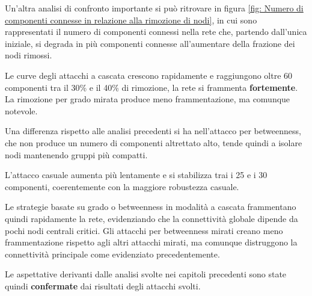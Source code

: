 Un'altra analisi di confronto importante si può ritrovare in figura \ref{fig: Numero di componenti connesse in relazione alla rimozione di nodi}, in cui sono rappresentati il numero di componenti connessi nella rete che, partendo dall'unica iniziale, si degrada in più componenti connesse all'aumentare della frazione dei nodi rimossi.

Le curve degli attacchi a cascata crescono rapidamente e raggiungono oltre 60 componenti tra il 30\% e il 40\% di rimozione, la rete si frammenta \textbf{fortemente}.
La rimozione per grado mirata produce meno frammentazione, ma comunque notevole.

Una differenza rispetto alle analisi precedenti si ha nell'attacco per betweenness, che non produce un numero di componenti altrettato alto, tende quindi a isolare nodi mantenendo gruppi più compatti.

L'attacco casuale aumenta più lentamente e si stabilizza trai i 25 e i 30 componenti, coerentemente con la maggiore robustezza casuale.

Le strategie basate su grado o betweenness in modalità a cascata frammentano quindi rapidamente la rete, evidenziando che la connettività globale dipende da pochi nodi centrali critici. Gli attacchi per betweenness mirati creano meno frammentazione rispetto agli altri attacchi mirati, ma comunque distruggono la connettività principale come evidenziato precedentemente.

Le aspettative derivanti dalle analisi svolte nei capitoli precedenti sono state quindi \textbf{confermate} dai risultati degli attacchi svolti.